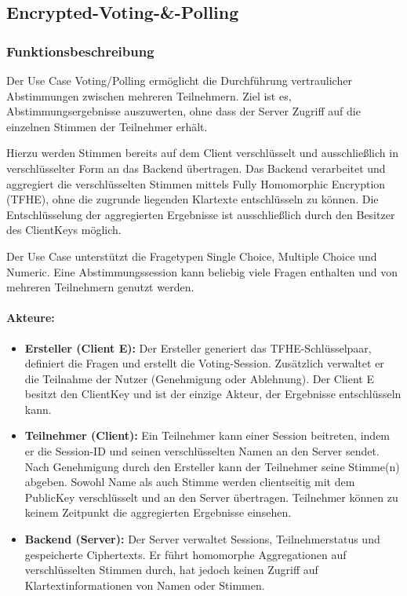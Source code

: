 \subsection{Encrypted-Voting-\&-Polling}
\label{sub:encrypted_voting_and_polling}

\subsubsection{Funktionsbeschreibung}
Der Use Case Voting/Polling ermöglicht die Durchführung vertraulicher
Abstimmungen zwischen mehreren Teilnehmern. Ziel ist es,
Abstimmungsergebnisse auszuwerten, ohne dass der Server Zugriff auf die
einzelnen Stimmen der Teilnehmer erhält.

Hierzu werden Stimmen bereits auf dem Client verschlüsselt und
ausschließlich in verschlüsselter Form an das Backend übertragen. Das
Backend verarbeitet und aggregiert die verschlüsselten Stimmen mittels
Fully Homomorphic Encryption (TFHE), ohne die zugrunde liegenden
Klartexte entschlüsseln zu können. Die Entschlüsselung der aggregierten
Ergebnisse ist ausschließlich durch den Besitzer des ClientKeys möglich.

Der Use Case unterstützt die Fragetypen Single Choice, Multiple Choice
und Numeric. Eine Abstimmungssession kann beliebig viele Fragen
enthalten und von mehreren Teilnehmern genutzt werden.


\paragraph{Akteure:}\label{akteure}

\begin{itemize}
\item
  \textbf{Ersteller (Client E):} Der Ersteller generiert das
  TFHE-Schlüsselpaar, definiert die Fragen und erstellt die
  Voting-Session. Zusätzlich verwaltet er die Teilnahme der Nutzer
  (Genehmigung oder Ablehnung). Der Client E besitzt den ClientKey und
  ist der einzige Akteur, der Ergebnisse entschlüsseln kann.
\item
  \textbf{Teilnehmer (Client):} Ein Teilnehmer kann einer Session
  beitreten, indem er die Session-ID und seinen verschlüsselten Namen an
  den Server sendet. Nach Genehmigung durch den Ersteller kann der
  Teilnehmer seine Stimme(n) abgeben. Sowohl Name als auch Stimme werden
  clientseitig mit dem PublicKey verschlüsselt und an den Server
  übertragen. Teilnehmer können zu keinem Zeitpunkt die aggregierten
  Ergebnisse einsehen.
\item
  \textbf{Backend (Server):} Der Server verwaltet Sessions,
  Teilnehmerstatus und gespeicherte Ciphertexts. Er führt homomorphe
  Aggregationen auf verschlüsselten Stimmen durch, hat jedoch keinen
  Zugriff auf Klartextinformationen von Namen oder Stimmen.
\end{itemize}

